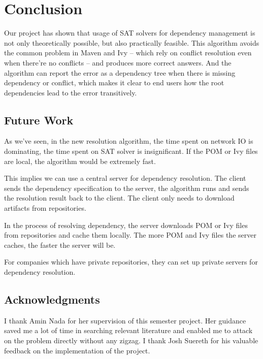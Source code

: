 \section{Conclusion}

Our project has shown that usage of SAT solvers for dependency management is not only theoretically possible, but also practically feasible. This algorithm avoids the common problem in Maven and Ivy -- which rely on conflict resolution even when there're no conflicts -- and produces more correct answers. And the algorithm can report the error as a dependency tree when there is missing dependency or conflict, which makes it clear to end users how the root dependencies lead to the error transitively.


\subsection{Future Work}

As we've seen, in the new resolution algorithm, the time spent on network IO is dominating, the time spent on SAT solver is insignificant. If the POM or Ivy files are local, the algorithm would be extremely fast.

This implies we can use a central server for dependency resolution. The client sends the dependency specification to the server, the algorithm runs and sends the resolution result back to the client. The client only needs to download artifacts from repositories.

In the process of resolving dependency, the server downloads POM or Ivy files from repositories and cache them locally. The more POM and Ivy files the server caches, the faster the server will be.

For companies which have private repositories, they can set up private servers for dependency resolution.

\subsection{Acknowledgments}

I thank Amin Nada for her supervision of this semester project. Her guidance saved me a lot of time in searching relevant literature and enabled me to attack on the problem directly without any zigzag. I thank Josh Suereth for his valuable feedback on the implementation of the project.
